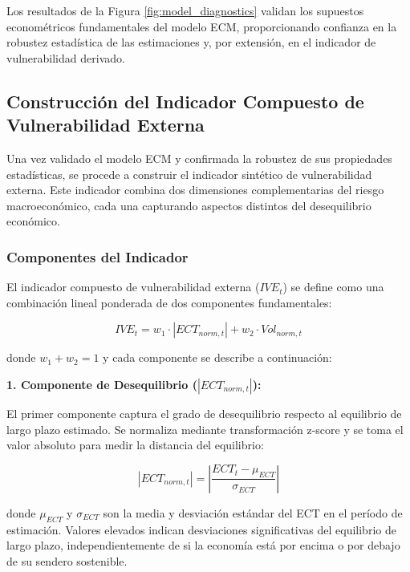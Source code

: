 \documentclass[3p,11pt]{elsarticle}
\begin{document}
Los resultados de la Figura \ref{fig:model_diagnostics} validan los supuestos econométricos 
fundamentales del modelo ECM, proporcionando confianza en la robustez estadística de las 
estimaciones y, por extensión, en el indicador de vulnerabilidad derivado.

\subsection{Construcción del Indicador Compuesto de Vulnerabilidad Externa}

Una vez validado el modelo ECM y confirmada la robustez de sus propiedades estadísticas, se procede a construir el indicador sintético de vulnerabilidad externa. Este indicador combina dos dimensiones complementarias del riesgo macroeconómico, cada una capturando aspectos distintos del desequilibrio económico.

\subsubsection{Componentes del Indicador}

El indicador compuesto de vulnerabilidad externa ($IVE_t$) se define como una combinación lineal ponderada de dos componentes fundamentales:

\begin{equation}
IVE_t = w_1 \cdot |ECT_{norm,t}| + w_2 \cdot Vol_{norm,t}
\label{eq:indicador_compuesto}
\end{equation}

donde $w_1 + w_2 = 1$ y cada componente se describe a continuación:

\textbf{1. Componente de Desequilibrio ($|ECT_{norm,t}|$):}

El primer componente captura el grado de desequilibrio respecto al equilibrio de largo plazo estimado. Se normaliza mediante transformación z-score y se toma el valor absoluto para medir la distancia del equilibrio:

\begin{equation}
|ECT_{norm,t}| = \left|\frac{ECT_t - \mu_{ECT}}{\sigma_{ECT}}\right|
\label{eq:ect_normalizado}
\end{equation}

donde $\mu_{ECT}$ y $\sigma_{ECT}$ son la media y desviación estándar del ECT en el período de estimación. Valores elevados indican desviaciones significativas del equilibrio de largo plazo, independientemente de si la economía está por encima o por debajo de su sendero sostenible.
\end{document}
